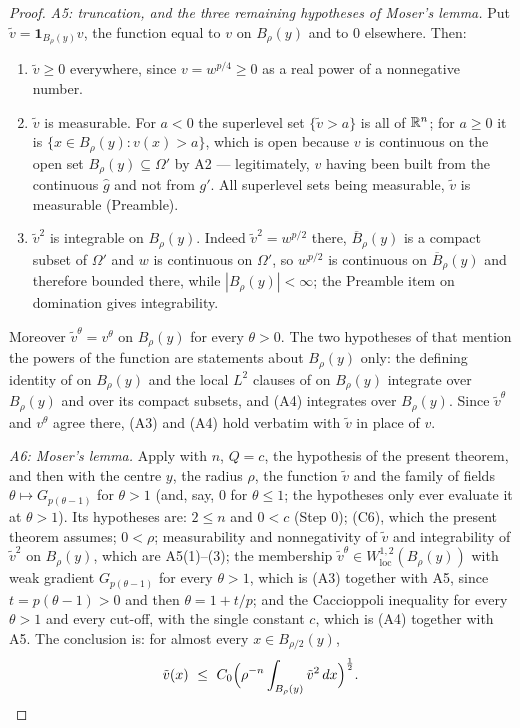 \begin{proof}
\emph{A5: truncation, and the three remaining hypotheses of Moser's lemma.}  Put
$\tilde v=\mathbf1_{B_\rho(y)}v$, the function equal to $v$ on $B_\rho(y)$ and to
$0$ elsewhere.  Then:
\begin{enumerate}
\item $\tilde v\ge0$ everywhere, since $v=w^{p/4}\ge0$ as a real power of a
  nonnegative number.
\item $\tilde v$ is measurable.  For $a<0$ the superlevel set
  $\{\tilde v>a\}$ is all of $\mathbb{R}^n$; for $a\ge0$ it is
  $\{x\in B_\rho(y):v(x)>a\}$, which is open because $v$ is continuous on the
  open set $B_\rho(y)\subseteq\Omega'$ by A2 --- legitimately, $v$ having been
  built from the continuous $\hat g$ and not from $g'$.  All superlevel sets being
  measurable, $\tilde v$ is measurable (Preamble).
\item $\tilde v^2$ is integrable on $B_\rho(y)$.  Indeed
  $\tilde v^2=w^{p/2}$ there, $\overline B_\rho(y)$ is a compact subset of
  $\Omega'$ and $w$ is continuous on $\Omega'$, so $w^{p/2}$ is continuous on
  $\overline B_\rho(y)$ and therefore bounded there, while
  $|B_\rho(y)|<\infty$; the Preamble item on domination gives integrability.
\end{enumerate}
Moreover $\tilde v^\theta=v^\theta$ on $B_\rho(y)$ for every $\theta>0$.  The two
hypotheses of  that mention the powers of the
function are statements about $B_\rho(y)$ only: the defining identity of
 on $B_\rho(y)$ and the local $L^2$ clauses of
 on $B_\rho(y)$ integrate over $B_\rho(y)$ and over its
compact subsets, and (A4) integrates over $B_\rho(y)$.  Since $\tilde v^\theta$
and $v^\theta$ agree there, (A3) and (A4) hold verbatim with $\tilde v$ in place
of $v$.

\emph{A6: Moser's lemma.}  Apply  with $n$,
$Q=c$, the hypothesis  of the present theorem,
and then with the centre $y$, the radius $\rho$, the function $\tilde v$ and the
family of fields $\theta\mapsto G_{p(\theta-1)}$ for $\theta>1$ (and, say, $0$
for $\theta\le1$; the hypotheses only ever evaluate it at $\theta>1$).  Its
hypotheses are: $2\le n$ and $0<c$ (Step 0); (C6), which the present theorem
assumes; $0<\rho$; measurability and nonnegativity of $\tilde v$ and
integrability of $\tilde v^2$ on $B_\rho(y)$, which are A5(1)--(3); the
membership $\tilde v^\theta\in W^{1,2}_{\mathrm{loc}}(B_\rho(y))$ with weak
gradient $G_{p(\theta-1)}$ for every $\theta>1$, which is (A3) together with
A5, since $t=p(\theta-1)>0$ and then $\theta=1+t/p$; and the Caccioppoli
inequality for every $\theta>1$ and every cut-off, with the single constant $c$,
which is (A4) together with A5.  The conclusion is: for almost every
$x\in B_{\rho/2}(y)$,
\[
\tilde v(x)\ \le\ C_0\Bigl(\rho^{-n}\int_{B_\rho(y)}\tilde v^2\,dx\Bigr)^{\frac12}.
\]


\end{proof}
